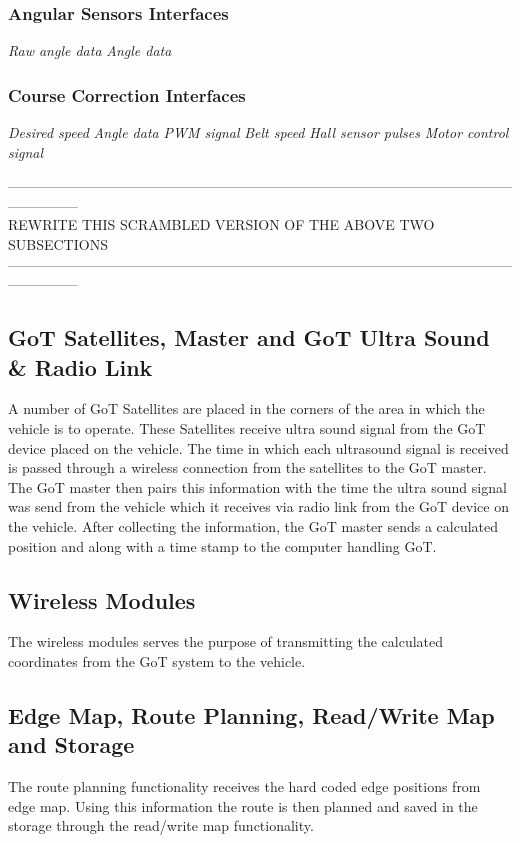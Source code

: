 \subsubsection{Angular Sensors Interfaces}
\textit{Raw angle data} \textit{Angle data}

\subsubsection{Course Correction Interfaces}
\textit{Desired speed} \textit{Angle data} \textit{PWM signal} \textit{Belt speed} \textit{Hall sensor pulses} \textit{Motor control signal}

---------------------------------------------------------------------------------------------------------------------------\\
REWRITE THIS SCRAMBLED VERSION OF THE ABOVE TWO SUBSECTIONS\\
---------------------------------------------------------------------------------------------------------------------------
\subsection{GoT Satellites, Master and GoT Ultra Sound \& Radio Link}
A number of GoT Satellites are placed in the corners of the area in which the vehicle is to operate. These Satellites receive ultra sound signal from the GoT device placed on the vehicle. The time in which each ultrasound signal is received is passed through a wireless connection from the satellites to the GoT master. The GoT master then pairs this information with the time the ultra sound signal was send from the vehicle which it receives via radio link from the GoT device on the vehicle. After collecting the information, the GoT master sends a calculated position and along with a time stamp to the computer handling GoT.

\subsection{Wireless Modules}
The wireless modules serves the purpose of transmitting the calculated coordinates from the GoT system to the vehicle.

\subsection{Edge Map, Route Planning, Read/Write Map and Storage}
The route planning functionality receives the hard coded edge positions from edge map. Using this information the route is then planned and saved in the storage through the read/write map functionality.

